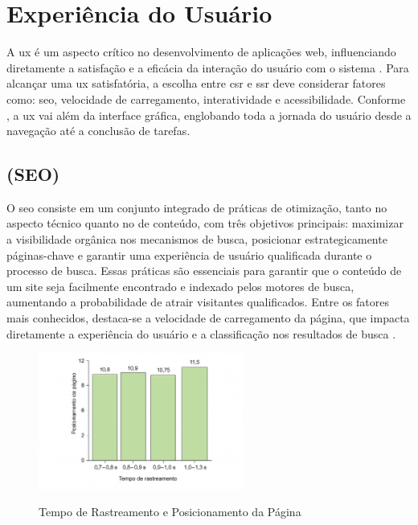 
\section{Experiência do Usuário}
\label{sec:ux}
A \acrfull{ux} é um aspecto crítico no desenvolvimento de aplicações web, influenciando diretamente a satisfação e a eficácia da interação do usuário com o sistema \cite{atori2023}. Para alcançar uma \acrshort{ux} satisfatória, a escolha entre \acrshort{csr} e \acrshort{ssr} deve considerar fatores como: {\acrshort{seo}}, velocidade de carregamento, interatividade e acessibilidade.
Conforme , a \acrshort{ux} vai além da interface gráfica, englobando toda a jornada do usuário desde a navegação até a conclusão de tarefas. 

\subsection{ (SEO)}
\label{sec:seo}

O \acrfull{seo} consiste em um conjunto integrado de práticas de otimização, tanto no aspecto técnico quanto no de conteúdo, com três objetivos principais: maximizar a visibilidade orgânica nos mecanismos de busca, posicionar estrategicamente páginas-chave e garantir uma experiência de usuário qualificada durante o processo de busca. Essas práticas são essenciais para garantir que o conteúdo de um site seja facilmente encontrado e indexado pelos motores de busca, aumentando a probabilidade de atrair visitantes qualificados. Entre os fatores mais conhecidos, destaca-se a velocidade de carregamento da página, que impacta diretamente a experiência do usuário e a classificação nos resultados de busca \cite{conor2022}.
\begin{figure}[H]
    \centering
    \caption{Tempo de Rastreamento e Posicionamento da Página}
    \includegraphics[width=0.6\textwidth]{media/rank_crawl_and_page_rank.png}
    \label{fig:rank_crawl_and_page_rank}
\end{figure}

